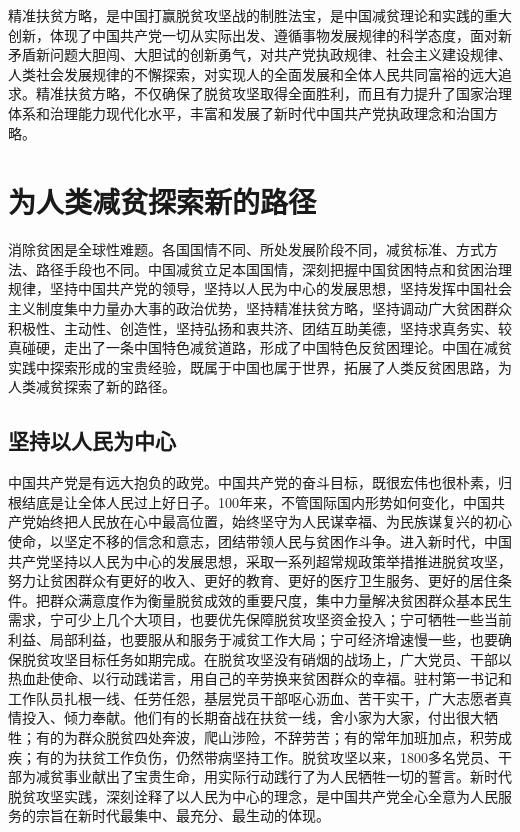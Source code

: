 \documentclass{ctexart}
\begin{document}
精准扶贫方略，是中国打赢脱贫攻坚战的制胜法宝，是中国减贫理论和实践的重大创新，体现了中国共产党一切从实际出发、遵循事物发展规律的科学态度，面对新矛盾新问题大胆闯、大胆试的创新勇气，对共产党执政规律、社会主义建设规律、人类社会发展规律的不懈探索，对实现人的全面发展和全体人民共同富裕的远大追求。精准扶贫方略，不仅确保了脱贫攻坚取得全面胜利，而且有力提升了国家治理体系和治理能力现代化水平，丰富和发展了新时代中国共产党执政理念和治国方略。

\section{为人类减贫探索新的路径}

消除贫困是全球性难题。各国国情不同、所处发展阶段不同，减贫标准、方式方法、路径手段也不同。中国减贫立足本国国情，深刻把握中国贫困特点和贫困治理规律，坚持中国共产党的领导，坚持以人民为中心的发展思想，坚持发挥中国社会主义制度集中力量办大事的政治优势，坚持精准扶贫方略，坚持调动广大贫困群众积极性、主动性、创造性，坚持弘扬和衷共济、团结互助美德，坚持求真务实、较真碰硬，走出了一条中国特色减贫道路，形成了中国特色反贫困理论。中国在减贫实践中探索形成的宝贵经验，既属于中国也属于世界，拓展了人类反贫困思路，为人类减贫探索了新的路径。

\subsection{坚持以人民为中心}

中国共产党是有远大抱负的政党。中国共产党的奋斗目标，既很宏伟也很朴素，归根结底是让全体人民过上好日子。100年来，不管国际国内形势如何变化，中国共产党始终把人民放在心中最高位置，始终坚守为人民谋幸福、为民族谋复兴的初心使命，以坚定不移的信念和意志，团结带领人民与贫困作斗争。进入新时代，中国共产党坚持以人民为中心的发展思想，采取一系列超常规政策举措推进脱贫攻坚，努力让贫困群众有更好的收入、更好的教育、更好的医疗卫生服务、更好的居住条件。把群众满意度作为衡量脱贫成效的重要尺度，集中力量解决贫困群众基本民生需求，宁可少上几个大项目，也要优先保障脱贫攻坚资金投入；宁可牺牲一些当前利益、局部利益，也要服从和服务于减贫工作大局；宁可经济增速慢一些，也要确保脱贫攻坚目标任务如期完成。在脱贫攻坚没有硝烟的战场上，广大党员、干部以热血赴使命、以行动践诺言，用自己的辛劳换来贫困群众的幸福。驻村第一书记和工作队员扎根一线、任劳任怨，基层党员干部呕心沥血、苦干实干，广大志愿者真情投入、倾力奉献。他们有的长期奋战在扶贫一线，舍小家为大家，付出很大牺牲；有的为群众脱贫四处奔波，爬山涉险，不辞劳苦；有的常年加班加点，积劳成疾；有的为扶贫工作负伤，仍然带病坚持工作。脱贫攻坚以来，1800多名党员、干部为减贫事业献出了宝贵生命，用实际行动践行了为人民牺牲一切的誓言。新时代脱贫攻坚实践，深刻诠释了以人民为中心的理念，是中国共产党全心全意为人民服务的宗旨在新时代最集中、最充分、最生动的体现。
\end{document}
